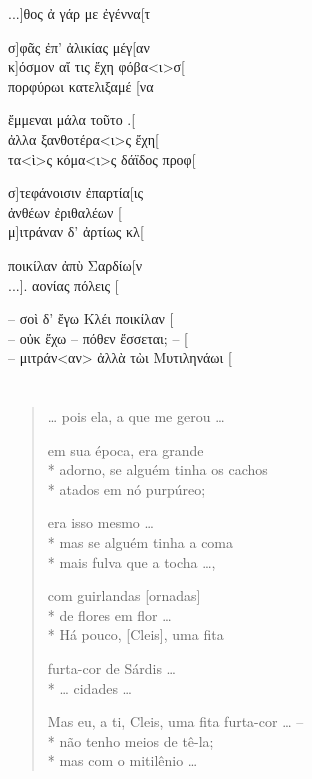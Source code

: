 {\begin{gkverse}
...]θος ἀ γάρ με ἐγέννα[τ

σ]φᾶς ἐπ’ ἀλικίας μέγ[αν\\
κ]όσμον αἴ τις ἔχη φόβα<ι>σ[\\
πορφύρωι κατελιξαμέ [να

ἔμμεναι μάλα τοῦτο .[\\
ἀλλα ξανθοτέρα<ι>ς ἔχη[\\
τα<ὶ>ς κόμα<ι>ς δάϊδος προφ[

σ]τεφάνοισιν ἐπαρτία[ις\\
ἀνθέων ἐριθαλέων [ \\
μ]ιτράναν δ’ ἀρτίως κλ[

ποικίλαν ἀπὺ Σαρδίω[ν\\
...]. αονίας πόλ{ε}ις [

\hspace*{16mm}

-- σοὶ δ’ ἔγω Κλέι ποικίλαν [\\
-- οὐκ ἔχω -- πόθεν ἔσσεται; -- [\\
-- μιτράν<αν> ἀλλὰ τὼι Μυτιληνάωι [
\end{gkverse}

\chapter*{}
\section*{}

\begin{verse}
\ldots{} pois ela, a que me gerou \ldots{}


em sua época, era grande \\*
adorno, se alguém tinha os cachos\\*
atados em nó purpúreo;


era isso mesmo \ldots{} \\*
mas se alguém tinha a coma\\*
mais fulva que a tocha \ldots{},

com guirlandas [ornadas]\\*
de flores em flor \ldots{}\\*
Há pouco, [Cleis], uma fita

furta-cor de Sárdis \ldots{}\\*
\ldots{} cidades \ldots{}

Mas eu, a ti, Cleis, uma fita furta-cor \ldots{} --\\*
não tenho meios de tê-la; \\*
mas com o mitilênio \ldots{}


\end{verse}}
